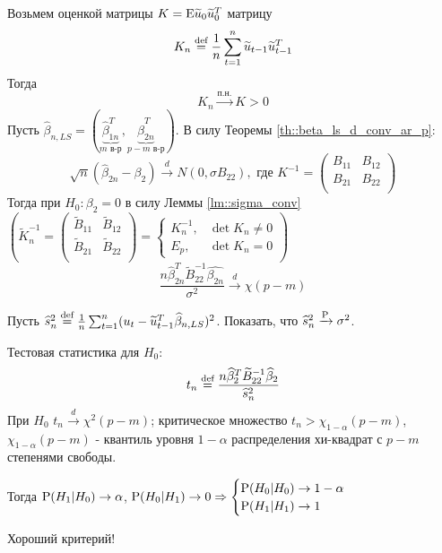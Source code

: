 Возьмем оценкой матрицы $K=\E\widetilde{u}_0\widetilde{u}_0^T$ матрицу
\[K_n\defeq\frac{1}{n}\sum_{t=1}^n\widetilde{u}_{t-1}\widetilde{u}_{t-1}^T\]
Тогда
\[K_n\xrightarrow{\text{п.н.}}K>0\]
Пусть $\widehat{\beta}_{n,LS}=(\underbrace{\widehat{\beta}_{1n}^T}_{m\text{ в-р}}, \underbrace{\widehat{\beta}_{2n}^T}_{p-m\text{ в-р}})$.
В силу Теоремы \ref{th::beta_ls_d_conv_ar_p}:
\[\sqrt{n}(\widehat{\beta}_{2n}-\beta_2)\xrightarrow{d}N(0,\sigma B_{22}),\text{ где } K^{-1}=\begin{pmatrix}
    B_{11} & B_{12} \\
    B_{21} & B_{22} \\
\end{pmatrix}\]
Тогда при $H_0:\beta_2=0$ в силу Леммы \ref{lm::sigma_conv} $\left(\widetilde{K}_n^{-1}=\begin{pmatrix}
    \widetilde{B}_{11} & \widetilde{B}_{12} \\
    \widetilde{B}_{21} & \widetilde{B}_{22} \\
\end{pmatrix} = \begin{cases}
    K_n^{-1},& \det K_n\neq0\\
    E_p,& \det K_n=0    
\end{cases}\right)$
\[\frac{n\widehat{\beta}^T_{2n}\widetilde{B}_{22}^{-1}\widehat{\beta_{2n}}}{\sigma^2}\xrightarrow{d}\chi(p-m)\]
\begin{task}
    Пусть $\widehat{s}_n^2\defeq\frac{1}{n}\sum_{t=1}^n(u_t-\widetilde{u}_{t-1}^T\widehat{\beta}_{n,LS})^2$.
    Показать, что $\widehat{s}_n^2\xrightarrow{\P}\sigma^2$.
\end{task}
Тестовая статистика для $H_0$:
\[t_n\defeq\frac{n\widehat{\beta}^T_2\widetilde{B}_{22}^{-1}\widehat{\beta}_2}{\widehat{s}_n^2}\]
При $H_0$ $t_n\xrightarrow{d}\chi^2(p-m)$; критическое множество $t_n>\chi_{1-\alpha}(p-m)$, $\chi_{1-\alpha}(p-m)$ - квантиль уровня $1-\alpha$
распределения хи-квадрат с $p-m$ степенями свободы.

Тогда $\P(H_1|H_0)\rightarrow\alpha$, $\P(H_0|H_1)\rightarrow0 \Rightarrow
\begin{cases}
    \P(H_0|H_0)\rightarrow1-\alpha \\
    \P(H_1|H_1)\rightarrow1
\end{cases} 
$

Хороший критерий!
